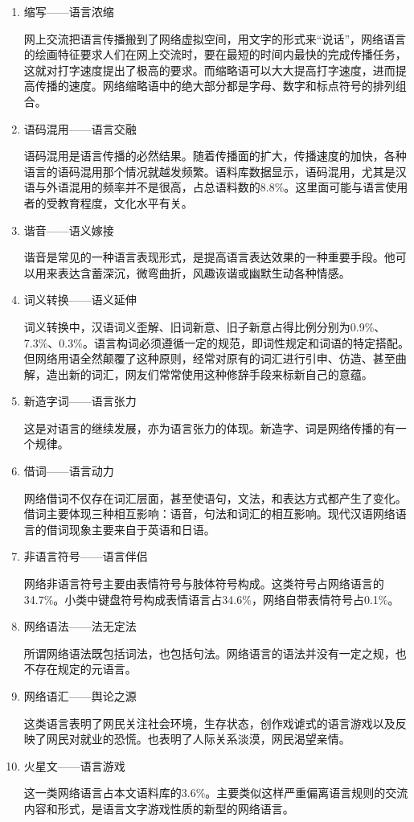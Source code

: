 \begin{enumerate}

\item 缩写——语言浓缩

网上交流把语言传播搬到了网络虚拟空间，用文字的形式来“说话”，网络语言的绘画特征要求人们在网上交流时，要在最短的时间内最快的完成传播任务，这就对打字速度提出了极高的要求。而缩略语可以大大提高打字速度，进而提高传播的速度。网络缩略语中的绝大部分都是字母、数字和标点符号的排列组合。

\item 语码混用——语言交融

语码混用是语言传播的必然结果。随着传播面的扩大，传播速度的加快，各种语言的语码混用那个情况就越发频繁。语料库数据显示，语码混用，尤其是汉语与外语混用的频率并不是很高，占总语料数的8.8\%。这里面可能与语言使用者的受教育程度，文化水平有关。

\item 谐音——语义嫁接

谐音是常见的一种语言表现形式，是提高语言表达效果的一种重要手段。他可以用来表达含蓄深沉，微弯曲折，风趣诙谐或幽默生动各种情感。

\item 词义转换——语义延伸

词义转换中，汉语词义歪解、旧词新意、旧子新意占得比例分别为0.9\%、7.3\%、0.3\%。语言构词必须遵循一定的规范，即词性规定和词语的特定搭配。但网络用语全然颠覆了这种原则，经常对原有的词汇进行引申、仿造、甚至曲解，造出新的词汇，网友们常常使用这种修辞手段来标新自己的意蕴。

\item 新造字词——语言张力

这是对语言的继续发展，亦为语言张力的体现。新造字、词是网络传播的有一个规律。 

\item 借词——语言动力

网络借词不仅存在词汇层面，甚至使语句，文法，和表达方式都产生了变化。借词主要体现三种相互影响：语音，句法和词汇的相互影响。现代汉语网络语言的借词现象主要来自于英语和日语。

\item 非语言符号——语言伴侣

网络非语言符号主要由表情符号与肢体符号构成。这类符号占网络语言的34.7\%。小类中键盘符号构成表情语言占34.6\%，网络自带表情符号占0.1\%。

\item 网络语法——法无定法

所谓网络语法既包括词法，也包括句法。网络语言的语法并没有一定之规，也不存在规定的元语言。

\item 网络语汇——舆论之源

这类语言表明了网民关注社会环境，生存状态，创作戏谑式的语言游戏以及反映了网民对就业的恐慌。也表明了人际关系淡漠，网民渴望亲情。

\item 火星文——语言游戏

这一类网络语言占本文语料库的3.6\%。主要类似这样严重偏离语言规则的交流内容和形式，是语言文字游戏性质的新型的网络语言。

\end{enumerate}

